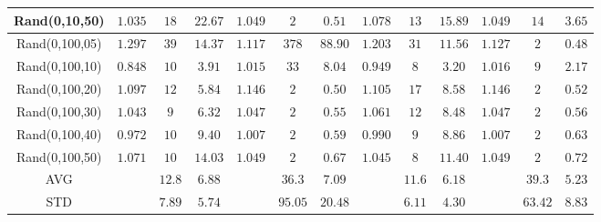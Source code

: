 \documentclass[3p]{elsarticle}
\begin{document}
\begin{table}[h!]
\begin{center}
{\begin{tabular}{c|ccc|ccc|ccc|ccc}
				Rand(0,10,50) & $1.035$ & $18$ & $22.67$ &$1.049$ & $2$ & $0.51$ &$1.078$ & $13$ & $15.89$ &$1.049$ & $14$ & $3.65$ \\
				\hline
				Rand(0,100,05) & $1.297$ & $39$ & $14.37$ &$1.117$ & $378$ & $88.90$ &$1.203$ & $31$ & $11.56$ &$1.127$ & $2$ & $0.48$ \\
				Rand(0,100,10) & $0.848$ & $10$ & $3.91$ &$1.015$ & $33$ & $8.04$ &$0.949$ & $8$ & $3.20$ &$1.016$ & $9$ & $2.17$ \\
				Rand(0,100,20) & $1.097$ & $12$ & $5.84$ &$1.146$ & $2$ & $0.50$ &$1.105$ & $17$ & $8.58$ &$1.146$ & $2$ & $0.52$ \\
				Rand(0,100,30) & $1.043$ & $9$ & $6.32$ &$1.047$ & $2$ & $0.55$ &$1.061$ & $12$ & $8.48$ &$1.047$ & $2$ & $0.56$ \\
				Rand(0,100,40) & $0.972$ & $10$ & $9.40$ &$1.007$ & $2$ & $0.59$ &$0.990$ & $9$ & $8.86$ &$1.007$ & $2$ & $0.63$ \\
				Rand(0,100,50) & $1.071$ & $10$ & $14.03$ &$1.049$ & $2$ & $0.67$ &$1.045$ & $8$ & $11.40$ &$1.049$ & $2$ & $0.72$ \\
				\hline 
				AVG &&	$12.8$ & $6.88$ && $36.3$ & $7.09$ && $11.6$ & $6.18$ && $39.3$ & $5.23$\\ 
				STD	&&	$7.89$ & $5.74$ &&	$95.05$ & $20.48$ && $6.11$ & $4.30$ && $63.42$ & $8.83$\\
				\hline 
			\end{tabular} 
		}
	\end{center}
\end{table}
\end{document}
